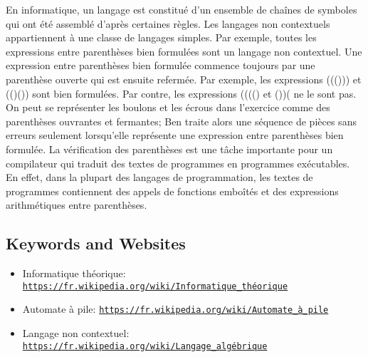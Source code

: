 \documentclass[a4paper,11pt]{report}
\newcommand{\BrochureUrlText}[1]{\texttt{#1}}
\begin{document}
En informatique, un langage est constitué d’un ensemble de chaînes de symboles qui ont été assemblé d’après certaines règles. Les langages non contextuels appartiennent à une classe de langages simples. Par exemple, toutes les expressions entre parenthèses bien formulées sont un langage non contextuel. Une expression entre parenthèses bien formulée commence toujours par une parenthèse ouverte qui est ensuite refermée. Par exemple, les expressions ((())) et (()()) sont bien formulées. Par contre, les expressions (((() et ())( ne le sont pas. On peut se représenter les boulons et les écrous dans l’exercice comme des parenthèses ouvrantes et fermantes; Ben traite alors une séquence de pièces sans erreurs seulement lorsqu’elle représente une expression entre parenthèses bien formulée. La vérification des parenthèses est une tâche importante pour un compilateur qui traduit des textes de programmes en programmes exécutables. En effet, dans la plupart des langages de programmation, les textes de programmes contiennent des appels de fonctions emboîtés et des expressions arithmétiques entre parenthèses.

{\raggedright

\subsection*{Keywords and Websites}

\begin{itemize}
  \item Informatique théorique: \href{https://fr.wikipedia.org/wiki/Informatique_th\%C3\%A9orique}{\BrochureUrlText{https://fr.wikipedia.org/wiki/Informatique\_théorique}}
  \item Automate à pile: \href{https://fr.wikipedia.org/wiki/Automate_\%C3\%A0_pile}{\BrochureUrlText{https://fr.wikipedia.org/wiki/Automate\_à\_pile}}
  \item Langage non contextuel: \href{https://fr.wikipedia.org/wiki/Langage_alg\%C3\%A9brique}{\BrochureUrlText{https://fr.wikipedia.org/wiki/Langage\_algébrique}}
\end{itemize}


}
\end{document}
